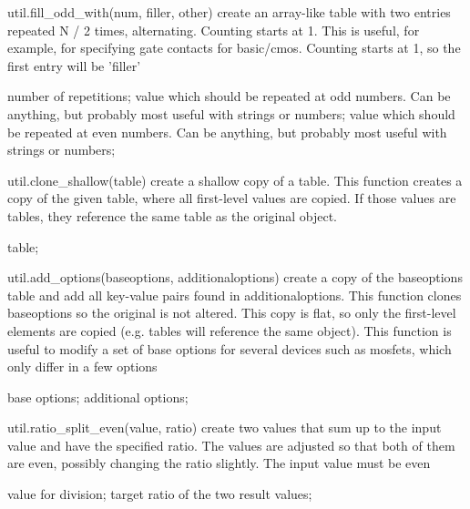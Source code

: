 \begin{APIfunc}{util.fill\_odd\_with(num, filler, other)}
    create an array-like table with two entries repeated N / 2 times, alternating. Counting starts at 1. This is useful, for example, for specifying gate contacts for basic/cmos. Counting starts at 1, so the first entry will be 'filler'
    \begin{APIparameters}
            number of repetitions;
            value which should be repeated at odd numbers. Can be anything, but probably most useful with strings or numbers;
            value which should be repeated at even numbers. Can be anything, but probably most useful with strings or numbers;
    \end{APIparameters}
\end{APIfunc}
\begin{APIfunc}{util.clone\_shallow(table)}
    create a shallow copy of a table. This function creates a copy of the given table, where all first-level values are copied. If those values are tables, they reference the same table as the original object.
    \begin{APIparameters}
            table;
    \end{APIparameters}
\end{APIfunc}
\begin{APIfunc}{util.add\_options(baseoptions, additionaloptions)}
    create a copy of the baseoptions table and add all key-value pairs found in additionaloptions. This function clones baseoptions so the original is not altered. This copy is flat, so only the first-level elements are copied (e.g. tables will reference the same object). This function is useful to modify a set of base options for several devices such as mosfets, which only differ in a few options
    \begin{APIparameters}
            base options;
            additional options;
    \end{APIparameters}
\end{APIfunc}
\begin{APIfunc}{util.ratio\_split\_even(value, ratio)}
    create two values that sum up to the input value and have the specified ratio. The values are adjusted so that both of them are even, possibly changing the ratio slightly. The input value must be even
    \begin{APIparameters}
            value for division;
            target ratio of the two result values;
    \end{APIparameters}
\end{APIfunc}
